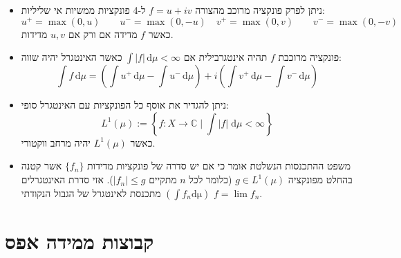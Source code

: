 \documentclass{tstextbook}
\begin{document}
\begin{summary}
  \begin{itemize}
    \item ניתן לפרק פונקציה מרוכב מהצורה \(f = u + iv\) ל-4 פונקציות ממשיות אי שליליות:
$$u^+ = \max(0, u) \qquad u^- = \max(0, -u)\quad v^+ = \max(0, v) \qquad v^- = \max(0, -v)$$
כאשר \(f\) מדידה אם ורק אם \(u, v\) מדידות.
    \item פונקציה מרוכבת \(f\) תהיה אינטגרבילית אם \(\int |f| \, \mathrm{d}\mu < \infty\) כאשר האינטגרל יהיה שווה:
$$\int f \, \mathrm{d}\mu = \left( \int u^+ \, \mathrm{d}\mu - \int u^- \, \mathrm{d}\mu \right) + i \left( \int v^+ \, \mathrm{d}\mu - \int v^- \, \mathrm{d}\mu \right)$$
    \item ניתן להגדיר את אוסף כל הפונקציות עם האינטגרל סופי:
$$L^{1}\left( \mu \right):= \left\{  f:X\to \mathbb{C} \mid \int  \lvert f \rvert  \;\mathrm{d} \mu < \infty   \right\}$$
כאשר \(L^{1}\left( \mu \right)\) יהיה מרחב ווקטורי.
    \item משפט ההתכנסות הנשלטת אומר כי אם יש סדרה של פונקציות מדידות \(\{ f_{n} \}\) אשר קטנה בהחלט מפונקציה \(g \in L^{1}\left( \mu \right)\) (כלומר לכל \(n\) מתקיים \(|f_{n}|\leq g\)). אזי סדרת האינטגרלים \(\left( \int f_{n}\mathrm{d\mu} \right)\) מתכנסת לאינטגרל של הגבול הנקודתי \(f=\lim f_{n}\).
  \end{itemize}
\end{summary}
\section{קבוצות ממידה אפס}
\end{document}
